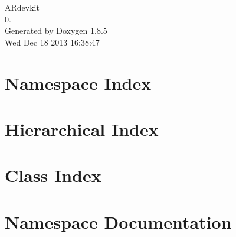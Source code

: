 \documentclass[twoside]{book}
\newcommand{\clearemptydoublepage}{%
  \newpage{\pagestyle{empty}\cleardoublepage}%
}
\begin{document}
\begin{titlepage}
\vspace*{7cm}
\begin{center}%
{\Large A\-Rdevkit \\[1ex]\large 0. }\\
\vspace*{1cm}
{\large Generated by Doxygen 1.8.5}\\
\vspace*{0.5cm}
{\small Wed Dec 18 2013 16:38:47}\\
\end{center}
\end{titlepage}
\clearemptydoublepage
\tableofcontents
\clearemptydoublepage
{}

\chapter{Namespace Index}

\chapter{Hierarchical Index}

\chapter{Class Index}

\chapter{Namespace Documentation}


































\end{document}
